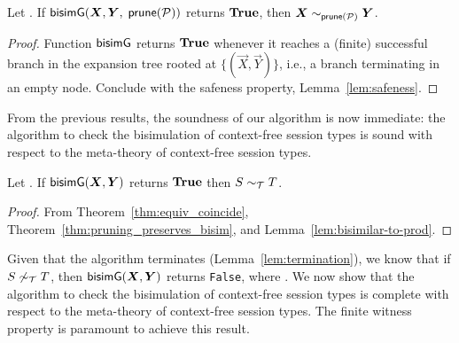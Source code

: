\begin{lemma}
  \label{lem:bisimilar-to-prod}
  \begin{sloppypar}
  	Let \grmcontext.  If 
  $\Bisim(\vec X,\vec Y,$ $ \mathsf{prune}(\mathcal P))$ returns $\mathbf{True}$, then
  $\vec X \sim_{\Prune(\productions)} \vec Y$.
  \end{sloppypar}
\end{lemma}

\begin{proof}
  Function $\mathsf{bisimG}$ returns $\mathbf{True}$ whenever it reaches a (finite)
  successful branch in the expansion tree rooted at
  $\{(\vec X,\vec Y)\}$, i.e., a branch terminating in an empty node. 
  Conclude with the safeness property,
  Lemma~\ref{lem:safeness}.
\end{proof}

From the previous results, the soundness of our algorithm is now
immediate: the algorithm to check the bisimulation of context-free
session types is sound with respect to
the meta-theory of context-free session types.

\begin{theorem}[Soundness]
  \label{thm:soundness}
  Let \grmcontext.  If $\Bisim(\vec X,\vec Y)$ returns $\mathbf{True}$ then
  $S\sim_\mathcal T T$.
\end{theorem}
%
\begin{proof}
  From Theorem~\ref{thm:equiv_coincide}, Theorem~\ref{thm:pruning_preserves_bisim}, 
  and Lemma~\ref{lem:bisimilar-to-prod}.
\end{proof}

 
Given that the algorithm terminates (Lemma~\ref{lem:termination}), we
know that if $S\not\sim_\mathcal T T$, then $\Bisim(\vec X, \vec Y)$ returns
\lstinline|False|, where \grmcontext.
%
We now show that the algorithm to check the bisimulation of
context-free session types is complete with respect to the meta-theory
of context-free session types. The finite witness property is
paramount to achieve this result.

